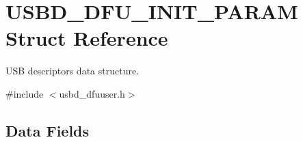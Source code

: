 \hypertarget{structUSBD__DFU__INIT__PARAM}{\section{U\-S\-B\-D\-\_\-\-D\-F\-U\-\_\-\-I\-N\-I\-T\-\_\-\-P\-A\-R\-A\-M Struct Reference}
\label{structUSBD__DFU__INIT__PARAM}
}


U\-S\-B descriptors data structure.  




{\ttfamily \#include $<$usbd\-\_\-dfuuser.\-h$>$}

\subsection*{Data Fields}
